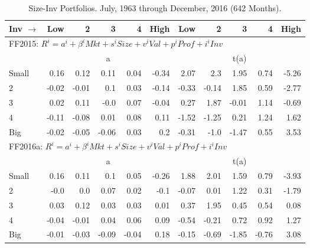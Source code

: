 
\begin{table}[!ht]
\centering
\caption{Size-Inv Portfolios. \footnotesize{July, 1963 through December, 2016 (642 Months).}}
\label{tbl:25_Size_Inv_b}
\begin{tabular}{lrrrrrrrrrr}
  \toprule
  Inv $\rightarrow$ & Low & 2 & 3 & 4 & High & Low & 2 & 3 & 4 & High \\ 
  \toprule
  \multicolumn{9}{l}{FF2015: $R^i=a^i+\beta^iMkt+s^iSize+v^iVal+p^iProf+i^iInv$} \\

      & \multicolumn{5}{c}{a} & \multicolumn{5}{c}{t(a)} \\
    \cmidrule(r){2-6} \cmidrule(r){7-11}
      Small  & 0.16  & 0.12  & 0.11  & 0.04  & -0.34   & 2.07  & 2.3  & 1.95  & 0.74  & -5.26  \\
          2  & -0.02  & -0.01  & 0.1  & 0.03  & -0.14   & -0.33  & -0.14  & 1.85  & 0.59  & -2.77  \\
          3  & 0.02  & 0.11  & -0.0  & 0.07  & -0.04   & 0.27  & 1.87  & -0.01  & 1.14  & -0.69  \\
          4  & -0.11  & -0.08  & 0.01  & 0.08  & 0.11   & -1.52  & -1.25  & 0.21  & 1.24  & 1.62  \\
      Big    & -0.02  & -0.05  & -0.06  & 0.03  & 0.2   & -0.31  & -1.0  & -1.47  & 0.55  & 3.53  \\

  \midrule
  \multicolumn{9}{l}{FF2016a: $R^i=a^i+\beta^iMkt+s^iSize+v^iVal+p^iProf+i^iInv$} \\

      & \multicolumn{5}{c}{a} & \multicolumn{5}{c}{t(a)} \\
    \cmidrule(r){2-6} \cmidrule(r){7-11}
      Small  & 0.16  & 0.11  & 0.1  & 0.05  & -0.26   & 1.88  & 2.01  & 1.59  & 0.79  & -3.93  \\
          2  & -0.0  & 0.0  & 0.07  & 0.02  & -0.1   & -0.07  & 0.01  & 1.22  & 0.31  & -1.79  \\
          3  & 0.03  & 0.12  & 0.03  & 0.03  & 0.01   & 0.37  & 1.95  & 0.45  & 0.54  & 0.08  \\
          4  & -0.04  & -0.01  & 0.04  & 0.06  & 0.09   & -0.54  & -0.21  & 0.72  & 0.92  & 1.27  \\
      Big    & -0.01  & -0.03  & -0.09  & -0.04  & 0.18   & -0.15  & -0.69  & -1.85  & -0.76  & 3.08  \\
  

  \bottomrule
\end{tabular}
\end{table}